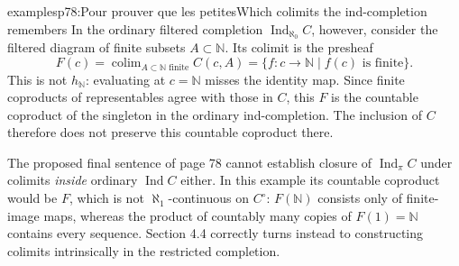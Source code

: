 \begin{dcomment}{examples}{p78:Pour prouver que les petites}{Which colimits the ind-completion remembers}
In the ordinary filtered completion $\operatorname{Ind}_{\aleph_0}C$, however, consider the filtered diagram of finite subsets $A\subset\mathbb N$.  Its colimit is the presheaf
\[
 F(c)=\operatorname{colim}_{A\subset\mathbb N\text{ finite}}C(c,A)
     =\{f:c\to\mathbb N\mid f(c)\text{ is finite}\}.
\]
This is not $h_{\mathbb N}$: evaluating at $c=\mathbb N$ misses the identity map.  Since finite coproducts of representables agree with those in $C$, this $F$ is the countable coproduct of the singleton in the ordinary ind-completion.  The inclusion of $C$ therefore does not preserve this countable coproduct there.

The proposed final sentence of page 78 cannot establish closure of $\operatorname{Ind}_\pi C$ under colimits \emph{inside} ordinary $\operatorname{Ind}C$ either.  In this example its countable coproduct would be $F$, which is not $\aleph_1$-continuous on $C^\circ$: $F(\mathbb N)$ consists only of finite-image maps, whereas the product of countably many copies of $F(1)=\mathbb N$ contains every sequence.  Section 4.4 correctly turns instead to constructing colimits intrinsically in the restricted completion.
\end{dcomment}

